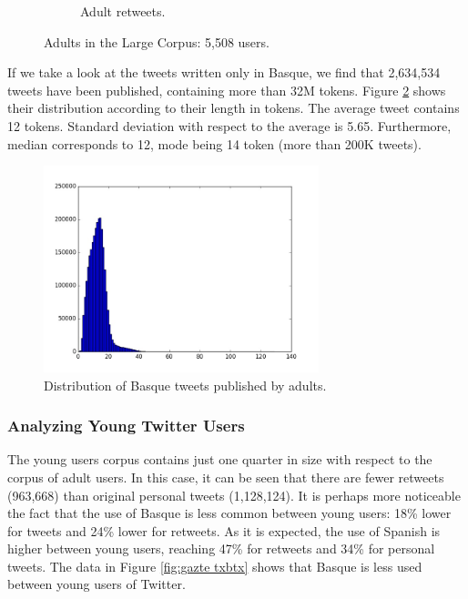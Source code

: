 \documentclass[information,article,submit,moreauthors,pdftex,10pt,a4paper]{Definitions/mdpi}
\begin{document}
\begin{figure}[H]
\begin{subfigure}[b]{0.48\linewidth}
    \caption{Adult retweets.}
  \end{subfigure}
  \caption{Adults in the Large Corpus: 5,508 users.}
  \label{fig:adults}
\end{figure}

If we take a look at the tweets written only in Basque, we find that 2,634,534 tweets have been published, containing more than 32M tokens. Figure  \ref{fig:txio luze held} shows their distribution according to their length in tokens. The average tweet contains 12 tokens. Standard deviation with respect to the average is 5.65. Furthermore, median corresponds to 12, mode being 14 token (more than 200K tweets).

\begin{figure}[H]
  \centering
  \includegraphics[height=6cm]{graf_for}
  \caption{Distribution of Basque tweets published by adults.}
  \label{fig:txio luze held}
\end{figure}

\subsubsection{Analyzing Young Twitter Users}

The young users corpus contains just one quarter in size with respect to the corpus of adult users. In this case, it can be seen that there are fewer retweets (963,668) than original personal tweets (1,128,124). It is perhaps more noticeable the fact that the use of Basque is less common between young users: 18\% lower for tweets and 24\% lower for retweets. As it is expected, the use of Spanish is higher between young users, reaching 47\% for retweets and 34\% for personal tweets. The data in Figure \ref{fig:gazte txbtx} shows that Basque is less used between young users of Twitter.
\end{document}
